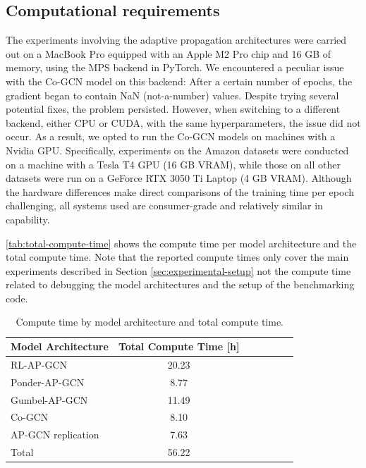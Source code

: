 \documentclass{gdl}
\begin{document}
\subsection{Computational requirements}
The experiments involving the adaptive propagation architectures were carried out on a MacBook Pro equipped with an Apple M2 Pro chip and 16 GB of memory, using the MPS backend in PyTorch. We encountered a peculiar issue with the Co-GCN model on this backend: After a certain number of epochs, the gradient began to contain NaN (not-a-number) values. Despite trying several potential fixes, the problem persisted. However, when switching to a different backend, either CPU or CUDA, with the same hyperparameters, the issue did not occur. As a result, we opted to run the Co-GCN models on machines with a Nvidia GPU. Specifically, experiments on the Amazon datasets were conducted on a machine with a Tesla T4 GPU (16 GB VRAM), while those on all other datasets were run on a GeForce RTX 3050 Ti Laptop (4 GB VRAM). Although the hardware differences make direct comparisons of the training time per epoch challenging, all systems used are consumer-grade and relatively similar in capability.

\autoref{tab:total-compute-time} shows the compute time per model architecture and the total compute time. Note that the reported compute times only cover the main experiments described in Section \ref{sec:experimental-setup} not the compute time related to debugging the model architectures and the setup of the benchmarking code.

\begin{table}[h]
    \centering
    \small\sf
    \setlength{\tabcolsep}{2pt}
    \captionsetup{justification=centerlast}
    \caption{Compute time by model architecture and total compute time.}
    \begin{tabular}{l c c c c c c}
        \toprule
        Model Architecture & Total Compute Time [h]\\
        \midrule
        RL-AP-GCN & 20.23 \\
        Ponder-AP-GCN & 8.77 \\
        Gumbel-AP-GCN & 11.49 \\
        Co-GCN & 8.10   \\
        AP-GCN replication & 7.63  \\
        \midrule
        Total & 56.22 \\
        \bottomrule
    \end{tabular}
    \label{tab:total-compute-time}
\end{table}
\end{document}
